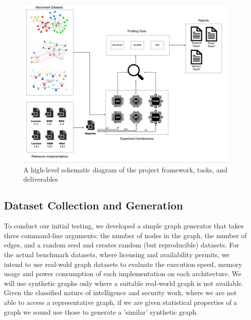 \documentclass[letterpaper, 10pt]{article}
\begin{document}
\begin{multicols}{2}
{{    \begin{figure}
            \centering
            \includegraphics[width=\columnwidth]{Papers/ARLIS_MPR_MN/Figures/high_level_overview.png}
            \caption{A high-level schematic diagram of the project framework, tasks, and deliverables}
            \label{fig:highLevelOverview}
        \end{figure}

    
    \subsection{Dataset Collection and Generation}\label{section:datasetCreation}
        To conduct our initial testing, we developed a simple graph generator that takes three command-line arguments: the number of nodes in the graph, the number of edges, and a random seed and creates random (but reproducible) datasets. 
        For the actual benchmark datasets, where licensing and availability permits, we intend to use real-wold graph datasets to evaluate the execution speed, memory usage and power consumption of each implementation on each architecture.
        We will use synthetic graphs only where a suitable real-world graph is not available. 
        Given the classified nature of intelligence and security work, where we are not able to access a representative graph, if we are given statistical properties of a graph we sound use those to generate a 'similar' synthetic graph.
        
}}
\end{multicols}
\end{document}
